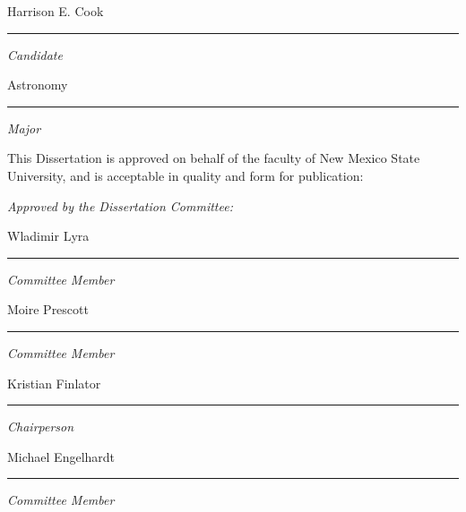\begin{flushleft}
{\normalsize Harrison E. Cook}
\vspace{3pt}
\hrule
\emph{\large Candidate}


{\normalsize Astronomy}
\vspace{3pt}
\hrule
\emph{\large Major}

\bigskip
\begin{singlespace}
{\normalsize This Dissertation is approved on behalf of the faculty of New Mexico State University, and is acceptable in quality and form for publication:}
\end{singlespace}

\emph{\large Approved by the Dissertation Committee:}

{\normalsize Wladimir Lyra}
\vspace{3pt}
\hrule
\emph{\large Committee Member}

\vspace{0.2in}

\normalsize{Moire Prescott}
\vspace{3pt}
\hrule
\emph{ \large Committee Member}

\vspace{0.2in}

\normalsize{Kristian Finlator}
\vspace{3pt}
\hrule
\emph{ \large Chairperson}

\vspace{0.2in}

\normalsize{Michael Engelhardt}
\vspace{3pt}
\hrule
\emph{ \large Committee Member}

\vspace{0.2in}


\end{flushleft}

